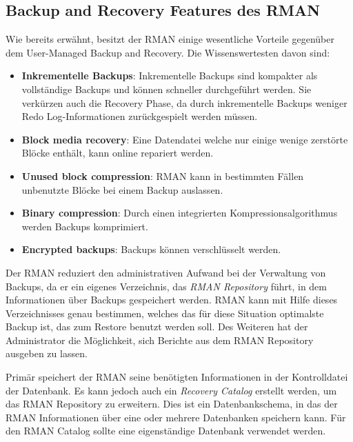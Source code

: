       \subsection{Backup and Recovery Features des RMAN}
        Wie bereits erw\"ahnt, besitzt der RMAN einige wesentliche Vorteile gegen\"uber dem User-Managed Backup and Recovery. Die Wissenswertesten davon sind:
        \begin{itemize}
          \item \textbf{Inkrementelle Backups}: Inkrementelle Backups sind kompakter als vollst\"andige Backups und k\"onnen schneller durchgef\"uhrt werden. Sie verk\"urzen auch die Recovery Phase, da durch inkrementelle Backups weniger Redo Log-Informationen zur\"uckgespielt werden m\"ussen.
          \item \textbf{Block media recovery}: Eine Datendatei welche nur einige wenige zerst\"orte Bl\"ocke enth\"alt, kann online repariert werden.
          \item \textbf{Unused block compression}: RMAN kann in bestimmten F\"allen unbenutzte Bl\"ocke bei einem Backup auslassen.
          \item \textbf{Binary compression}: Durch einen integrierten Kompressionsalgorithmus werden Backups komprimiert.
          \item \textbf{Encrypted backups}: Backups k\"onnen verschl\"usselt werden.
        \end{itemize}
\clearpage
        Der RMAN reduziert den administrativen Aufwand bei der Verwaltung von
        Backups, da er ein eigenes Verzeichnis, das \textit{RMAN Repository}
        f\"uhrt, in dem  Informationen \"uber Backups gespeichert werden. RMAN
        kann mit Hilfe dieses Verzeichnisses genau bestimmen, welches das f\"ur
        diese Situation optimalste Backup ist, das zum Restore benutzt werden
        soll. Des Weiteren hat der Administrator die M\"oglichkeit, sich
        Berichte aus dem RMAN Repository ausgeben zu lassen.

        Prim\"ar speichert der RMAN seine ben\"otigten Informationen in der Kontrolldatei der Datenbank. Es kann jedoch auch ein \textit{Recovery Catalog} erstellt werden, um das RMAN Repository zu erweitern. Dies ist ein Datenbankschema, in das der RMAN Informationen \"uber eine oder mehrere Datenbanken speichern kann. F\"ur den RMAN Catalog sollte eine eigenst\"andige Datenbank verwendet werden.
